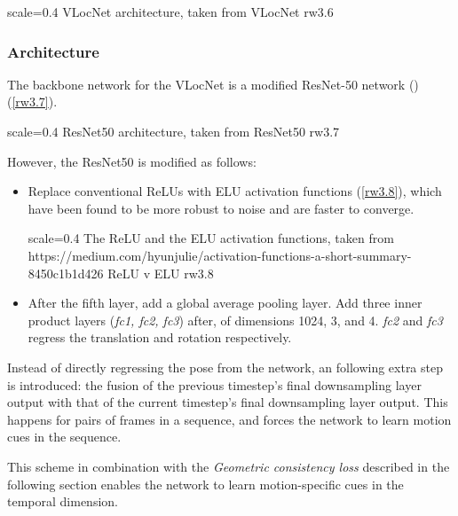 {scale=0.4}%
{VLocNet architecture, taken from \cite{Valada2018}}%
{VLocNet}%
{rw3.6} %

\subsubsection{Architecture}
The backbone network for the VLocNet is a modified ResNet-50 network (\cite{He2015})(\ref{rw3.7}).

{scale=0.4}%
{ResNet50 architecture, taken from \cite{Mahmood2020}}%
{ResNet50}%
{rw3.7} %

However, the ResNet50 is modified as follows:

\begin{itemize}
	\item Replace conventional ReLUs with ELU activation functions (\ref{rw3.8}), which have been found to be more robust to noise and are faster to converge.
	
    {scale=0.4}%
    {The ReLU and the ELU activation functions, taken from https://medium.com/hyunjulie/activation-functions-a-short-summary-8450c1b1d426}%
    {ReLU v ELU}%
	{rw3.8} %

	\item After the fifth layer, add a global average pooling layer. Add three inner product layers (\textit{fc1, fc2, fc3}) after, of dimensions 1024, 3, and 4.
\emph{fc2} and \emph{fc3} regress the translation and rotation respectively. 
\end{itemize}

	Instead of directly regressing the pose from the network, an following extra step is introduced: the fusion of the previous timestep's final downsampling layer output
with that of the current timestep's final downsampling layer output. This happens for pairs of frames in a sequence, and forces the network to learn motion cues in the sequence.

This scheme in combination with the \emph{Geometric consistency loss} described in the following section enables the network to learn motion-specific cues in the 
temporal dimension.

